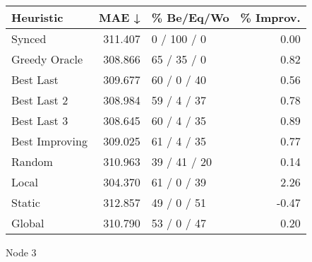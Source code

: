 \begin{tabular}{lrlr}
\toprule
\textbf{Heuristic} & \textbf{MAE ↓} & \textbf{\% Be/Eq/Wo} & \textbf{\% Improv.} \\
\midrule
            Synced &        311.407 &          0 / 100 / 0 &                0.00 \\
     Greedy Oracle &        308.866 &          65 / 35 / 0 &                0.82 \\
         Best Last &        309.677 &          60 / 0 / 40 &                0.56 \\
       Best Last 2 &        308.984 &          59 / 4 / 37 &                0.78 \\
       Best Last 3 &        308.645 &          60 / 4 / 35 &                0.89 \\
    Best Improving &        309.025 &          61 / 4 / 35 &                0.77 \\
            Random &        310.963 &         39 / 41 / 20 &                0.14 \\
             Local &        304.370 &          61 / 0 / 39 &                2.26 \\
            Static &        312.857 &          49 / 0 / 51 &               -0.47 \\
            Global &        310.790 &          53 / 0 / 47 &                0.20 \\
\bottomrule
\end{tabular}
\caption{Node 3}
\label{tab:iid_lr01_le1_bs2_3}
